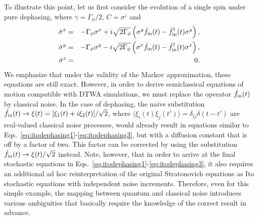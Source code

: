 \documentclass[pra,twocolumn,showpacs,preprintnumbers,amsmath,amssymb,superscriptaddress]{revtex4-1}
\begin{document}
To illustrate this point, let us first consider the evolution of a single spin under pure dephasing, where  $\gamma=\Gamma_\phi/2$, $C=\sigma^z$ and 
\begin{eqnarray}
\dot \sigma^x &=&- \Gamma_\phi \sigma^x + i \sqrt{2\Gamma_\phi} \left( \sigma^y \hat f_{\rm in}(t) - \hat f_{\rm in}^\dag(t) \sigma^y\right),  \\
\dot \sigma^y &=& - \Gamma_\phi \sigma^y - i \sqrt{2\Gamma_\phi} \left( \sigma^x \hat f_{\rm in}(t) - \hat f_{\rm in}^\dag(t) \sigma^x\right),  \\
\dot \sigma^z&=&0. 
\end{eqnarray}
We emphasize that under the validity of the Markov approximation, these equations are still exact. However, in order to derive semiclassical equations of motion compatible with DTWA simulations, we must replace the operator $\hat f_{\rm in}(t)$ by classical noise. In the case of dephasing, the naive substitution $\hat f_{\rm in}(t)\rightarrow \xi(t)=[\xi_1(t)+i\xi_2(t)]/\sqrt{2}$, where $\langle \xi_i(t) \xi_j(t')\rangle=\delta_{ij} \delta(t-t')$ are real-valued classical noise processes, would already result in equations similar to Eqs.~\eqref{eq:itodephasing1}-\eqref{eq:itodephasing3}, but with a diffusion constant that is off by a factor of two. This factor can be corrected  by using  the substitution $\hat f_{\rm in}(t)\rightarrow \xi(t)/\sqrt{2}$ instead. Note, however, that in order to arrive at the final stochastic equations in Eqs.~\eqref{eq:itodephasing1}-\eqref{eq:itodephasing3}, it also requires an additional ad hoc reinterpretation of the original Stratonovich equations as Ito stochastic equations with independent noise increments. Therefore, even for this simple example, the mapping between quantum and classical noise introduces various ambiguities that basically require the knowledge of the correct result in advance.  
\end{document}
